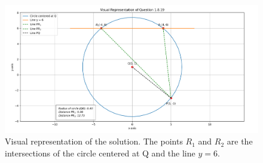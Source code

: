 \documentclass[journal]{IEEEtran}
\begin{document}
\begin{figure}[h!]
    \centering
    \includegraphics[width=0.9\columnwidth]{figs/pure_python.png}
    \caption{Visual representation of the solution. The points $R_1$ and $R_2$ are the intersections of the circle centered at Q and the line $y=6$.}
    \label{fig:fig}
 \end{figure}
\end{document}
